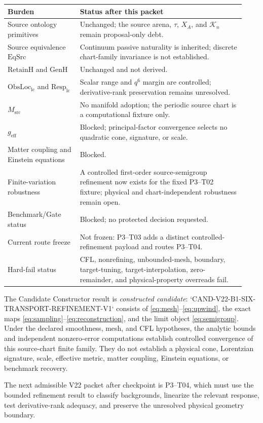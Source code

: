 \documentclass[11pt]{article}
\newcommand{\K}{\mathcal K}
\begin{document}
\begin{center}
\small
\begin{tabular}{p{0.29\linewidth}p{0.64\linewidth}}
\toprule
Burden & Status after this packet\\
\midrule
Source ontology primitives & Unchanged; the source arena, $\tau$, $X_A$, and $\K_n$ remain proposal-only debt.\\
Source equivalence $\mathrm{EqSrc}$ & Continuum passive naturality is inherited; discrete chart-family invariance is not established.\\
$\mathrm{RetainH}$ and $\mathrm{GenH}$ & Unchanged and not derived.\\
$\mathrm{ObsLoc}_{\mathrm{lc}}$ and $\mathrm{Resp}_{\mathrm{lc}}$ & Scalar range and $q^6$ margin are controlled; derivative-rank preservation remains unresolved.\\
$M_{\mathrm{src}}$ & No manifold adoption; the periodic source chart is a computational fixture only.\\
$g_{\mathrm{eff}}$ & Blocked; principal-factor convergence selects no quadratic cone, signature, or scale.\\
Matter coupling and Einstein equations & Blocked.\\
Finite-variation robustness & A controlled first-order source-semigroup refinement now exists for the fixed P3--T02 fixture; physical and chart-independent robustness remain open.\\
Benchmark/Gate status & Blocked; no protected decision requested.\\
Current route freeze & Not frozen: P3--T03 adds a distinct controlled-refinement payload and routes P3--T04.\\
Hard-fail status & CFL, nonrefining, unbounded-mesh, boundary, target-tuning, target-interpolation, zero-remainder, and physical-property overreads fail.\\
\bottomrule
\end{tabular}
\end{center}

The Candidate Constructor result is \emph{constructed candidate}:
`CAND-V22-B1-SIX-TRANSPORT-REFINEMENT-V1` consists of
\eqref{eq:mesh}--\eqref{eq:upwind}, the exact maps
\eqref{eq:sampling}--\eqref{eq:reconstruction}, and the limit object
\eqref{eq:semigroup}.  Under the declared smoothness, mesh, and CFL
hypotheses, the analytic bounds and independent nonzero-error computations
establish controlled convergence of this source-chart finite family.  They do
not establish a physical cone, Lorentzian signature, scale, effective metric,
matter coupling, Einstein equations, or benchmark recovery.

The next admissible V22 packet after checkpoint is P3--T04, which must use the
bounded refinement result to classify backgrounds, linearize the relevant
response, test derivative-rank adequacy, and preserve the unresolved physical
geometry boundary.
\end{document}
